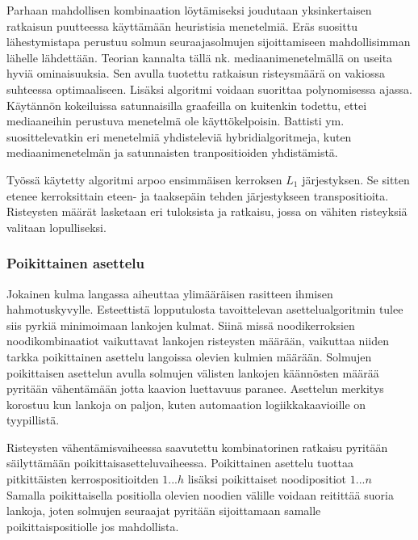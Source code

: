 \documentclass[finnish,12pt]{article}
\begin{document}
Parhaan mahdollisen kombinaation löytämiseksi joudutaan yksinkertaisen ratkaisun puutteessa käyttämään heuristisia menetelmiä.
Eräs suosittu lähestymistapa perustuu solmun seuraajasolmujen sijoittamiseen mahdollisimman lähelle lähdettään.
Teorian kannalta tällä nk. mediaanimenetelmällä on useita hyviä ominaisuuksia.
Sen avulla tuotettu ratkaisun risteysmäärä on vakiossa suhteessa optimaaliseen.
Lisäksi algoritmi voidaan suorittaa polynomisessa ajassa.
Käytännön kokeiluissa satunnaisilla graafeilla on kuitenkin todettu, ettei mediaaneihin perustuva menetelmä ole käyttökelpoisin. \cite{RefWorks:52}
Battisti ym. suosittelevatkin eri menetelmiä yhdisteleviä hybridialgoritmeja, kuten mediaanimenetelmän ja satunnaisten tranpositioiden yhdistämistä\cite{RefWorks:39}.

Työssä käytetty algoritmi arpoo ensimmäisen kerroksen $L_1$ järjestyksen.
Se sitten etenee kerroksittain eteen- ja taaksepäin tehden järjestykseen transpositioita.
Risteysten määrät lasketaan eri tuloksista ja ratkaisu, jossa on vähiten risteyksiä valitaan lopulliseksi.


		\subsubsection{Poikittainen asettelu}

Jokainen kulma langassa aiheuttaa ylimääräisen rasitteen ihmisen hahmotuskyvylle. \cite{RefWorks:47}
Esteettistä lopputulosta tavoittelevan asettelualgoritmin tulee siis pyrkiä minimoimaan lankojen kulmat.
Siinä missä noodikerroksien noodikombinaatiot vaikuttavat lankojen risteysten määrään, vaikuttaa niiden tarkka poikittainen asettelu langoissa olevien kulmien määrään.
Solmujen poikittaisen asettelun avulla solmujen välisten lankojen käännösten määrää pyritään vähentämään jotta kaavion luettavuus paranee.
Asettelun merkitys korostuu kun lankoja on paljon, kuten automaation logiikkakaavioille on tyypillistä.

Risteysten vähentämisvaiheessa saavutettu kombinatorinen ratkaisu pyritään säilyttämään poikittaisasetteluvaiheessa.
Poikittainen asettelu tuottaa pitkittäisten kerrospositioitden $1 ... h$ lisäksi poikittaiset noodipositiot $1 ... n $
Samalla poikittaisella positiolla olevien noodien välille voidaan reitittää suoria lankoja, joten solmujen seuraajat pyritään sijoittamaan samalle poikittaispositiolle jos mahdollista.
\end{document}
